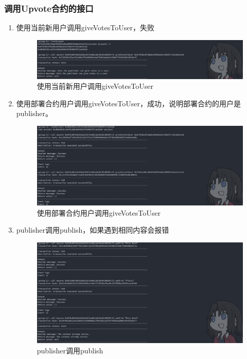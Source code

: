 \documentclass[a4paper, 11pt]{article}
\begin{document}
\subsubsection{调用Upvote合约的接口}
\begin{enumerate}
      \item 使用当前新用户调用giveVotesToUser，失败
      \begin{figure}[H]
            \centering
            \includegraphics[width = 0.8 \textwidth]{giveVotesError.png}
            \caption{使用当前新用户调用giveVotesToUser}
      \end{figure}

      \item 使用部署合约用户调用giveVotesToUser，成功，说明部署合约的用户是publisher。
      \begin{figure}[H]
            \centering
            \includegraphics[width = 0.8 \textwidth]{giveVotes.png}
            \caption{使用部署合约用户调用giveVotesToUser}
      \end{figure}

      \item publisher调用publish，如果遇到相同内容会报错
      \begin{figure}[H]
            \centering
            \includegraphics[width = 0.8 \textwidth]{publish.png}
            \caption{publisher调用publish}
      \end{figure}


\end{enumerate}
\end{document}
